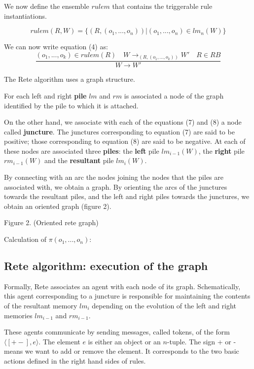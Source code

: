 We now define the ensemble $rulem$ that contains the triggerable rule instantiations.

\begin{equation}
rulem(R, W) = \{ (R, (o_1, ..., o_n)) | (o_1, ..., o_n) \in lm_n(W) \}
\end{equation}

We can now write equation (4) as:
\begin{equation}
\frac{(o_1, ..., o_{k}) \in rulem (R) \quad W \rightarrow_{(R, (o_1, ..., o_k))} W' \quad R \in RB }
{W \rightarrow W'}
\end{equation}

The Rete algorithm uses a graph structure.

For each left and right \textbf{pile} $lm$ and $rm$ is associated a node of the graph identified by the pile to which it is attached.

On the other hand, we associate with each of the equations (7) and (8) a node called \textbf{juncture}.
The junctures corresponding to equation (7) are said to be positive; those corresponding to equation (8)
are said to be negative.  At each of these nodes are associated three \textbf{piles}: the \textbf{left} pile $lm_{i-1} (W)$, the \textbf{right} pile $rm_{i-1} (W)$ and the \textbf{resultant} pile $lm_i (W)$.

By connecting with an arc the nodes joining the nodes that the piles are associated with, we obtain a
graph.  By orienting the arcs of the junctures towards the resultant piles, and the left and right piles towards the junctures, we obtain an oriented graph (figure 2).

Figure 2. (Oriented rete graph)

Calculation of $\pi(o_1, ..., o_n)$:

\subsection{Rete algorithm: execution of the graph}

Formally, Rete associates an agent with each node of its graph. Schematically,
this agent corresponding to a juncture is responsible for maintaining the contents of the
resultant memory $lm_i$ depending on the evolution of the left and right memories $lm_{i-1}$ and $rm_{i-1}$.

These agents communicate by sending messages, called tokens, of the form
$\langle [+ -], e \rangle$. The element $e$ is either an object or an $n$-tuple. The sign + or - means
we want to add or remove the element. It corresponds to the two basic actions
defined in the right hand sides of rules.

